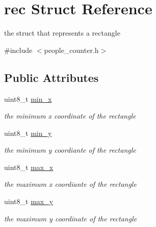 \hypertarget{structrec}{}\section{rec Struct Reference}
\label{structrec}


the struct that represents a rectangle  




{\ttfamily \#include $<$people\+\_\+counter.\+h$>$}

\subsection*{Public Attributes}
\begin{DoxyCompactItemize}
\item 
\mbox{\label{structrec_aeb00f8cfe4ea52dbc9bd5456a754f850}} 
uint8\+\_\+t \mbox{\hyperlink{structrec_aeb00f8cfe4ea52dbc9bd5456a754f850}{min\+\_\+x}}
\begin{DoxyCompactList}\small\item\em the minimum x coordinate of the rectangle \end{DoxyCompactList}\item 
\mbox{\label{structrec_a09347780784baec3563049cd07f1ef08}} 
uint8\+\_\+t \mbox{\hyperlink{structrec_a09347780784baec3563049cd07f1ef08}{min\+\_\+y}}
\begin{DoxyCompactList}\small\item\em the minimum y coordiante of the rectangle \end{DoxyCompactList}\item 
\mbox{\label{structrec_aca687dee9a968ba7e82f6e3fa4ef60c3}} 
uint8\+\_\+t \mbox{\hyperlink{structrec_aca687dee9a968ba7e82f6e3fa4ef60c3}{max\+\_\+x}}
\begin{DoxyCompactList}\small\item\em the maximum x coordiante of the rectangle \end{DoxyCompactList}\item 
\mbox{\label{structrec_a73d4d0dd4e97c9f379cd0a1f3ce92e1b}} 
uint8\+\_\+t \mbox{\hyperlink{structrec_a73d4d0dd4e97c9f379cd0a1f3ce92e1b}{max\+\_\+y}}
\begin{DoxyCompactList}\small\item\em the maximum y coordinate of the rectangle \end{DoxyCompactList}\item 

\end{DoxyCompactItemize}
